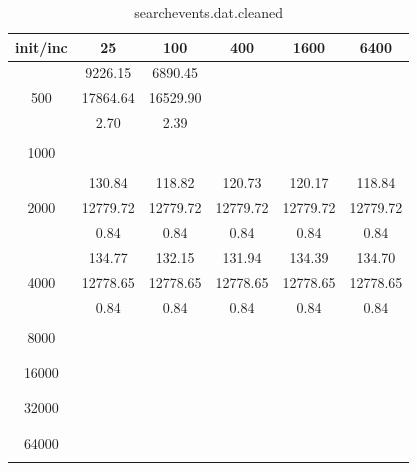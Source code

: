 {\begin{table}[th]
\caption{searchevents.dat.cleaned}
\label{tab:searchevents.dat.cleaned}
\centering
\begin{tabular}{|c||c|c|c|c|c|}
\hline
init/inc & 25 & 100 & 400 & 1600 & 6400 \\ \hline \hline
  & 9226.15 & 6890.45 &  &  & \\ 
500  & 17864.64 & 16529.90 &  &  & \\ 
  & 2.70 & 2.39 &  &  & \\ \hline 
  &  &  &  &  & \\ 
1000  &  &  &  &  & \\ 
  &  &  &  &  & \\ \hline 
  & 130.84 & 118.82 & 120.73 & 120.17 & 118.84\\ 
2000  & 12779.72 & 12779.72 & 12779.72 & 12779.72 & 12779.72\\ 
  & 0.84 & 0.84 & 0.84 & 0.84 & 0.84\\ \hline 
  & 134.77 & 132.15 & 131.94 & 134.39 & 134.70\\ 
4000  & 12778.65 & 12778.65 & 12778.65 & 12778.65 & 12778.65\\ 
  & 0.84 & 0.84 & 0.84 & 0.84 & 0.84\\ \hline 
  &  &  &  &  & \\ 
8000  &  &  &  &  & \\ 
  &  &  &  &  & \\ \hline 
  &  &  &  &  & \\ 
16000  &  &  &  &  & \\ 
  &  &  &  &  & \\ \hline 
  &  &  &  &  & \\ 
32000  &  &  &  &  & \\ 
  &  &  &  &  & \\ \hline 
  &  &  &  &  & \\ 
64000  &  &  &  &  & \\ 
  &  &  &  &  & \\ \hline 
\end{tabular}
\end{table}

}
